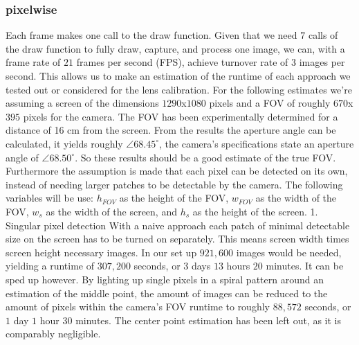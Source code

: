 \documentclass[journal,final,a4paper,twoside]{PS}
\begin{document}
\subsubsection{pixelwise}
\label{sec:pixelwise}
Each frame makes one call to the draw function. Given that we need $7$ calls of the draw function to fully draw, capture, and process one image, we can, with a frame rate of $21$ frames per second (FPS), achieve turnover rate of $3$ images per second. This allows us to make an estimation of the runtime of each approach we tested out or considered for the lens calibration. For the following estimates we're assuming a screen of the dimensions $1290$x$1080$ pixels and a FOV of roughly $670$x$395$ pixels for the camera. The FOV has been experimentally determined for a distance of 16 cm from the screen. From the results the aperture angle can be calculated, it yields roughly $\angle 68.45^{\circ}$, the camera’s specifications state an aperture angle of $\angle 68.50^{\circ}$. So these results should be a good estimate of the true FOV. Furthermore the assumption is made that each pixel can be detected on its own, instead of needing larger patches to be detectable by the camera.
The following variables will be use: $h_{FOV}$ as the height of the FOV, $w_{FOV}$ as the width of the FOV, $w_s$ as the width of the screen, and $h_s$ as the height of the screen.
1. Singular pixel detection
With a naive approach each patch of minimal detectable size on the screen has to be turned on separately. This means screen width times screen height necessary images. In our set up $921,600$ images would be needed, yielding a runtime of $307,200$ seconds, or $3$ days $13$ hours $20$ minutes.
It can be sped up however. By lighting up single pixels in a spiral pattern around an estimation of the middle point, the amount of images can be reduced to the amount of pixels within the camera’s FOV runtime to roughly $88,572$ seconds, or $1$ day $1$ hour $30$ minutes.
The center point estimation has been left out, as it is comparably negligible.\\
	
\end{document}
